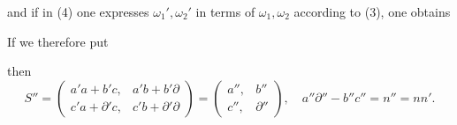and if in (4) one expresses $\omega_1', \omega_2'$ in terms of $\omega_1, \omega_2$ according to (3), one obtains


If we therefore put


then
\[
S'' = \begin{pmatrix} a'a+b'c, & a'b+b'\partial \\ c'a+\partial'c, & c'b+\partial'\partial \end{pmatrix} = \begin{pmatrix} a'', & b'' \\ c'', & \partial'' \end{pmatrix}, \quad a''\partial'' - b''c'' = n'' = nn'.
\]
